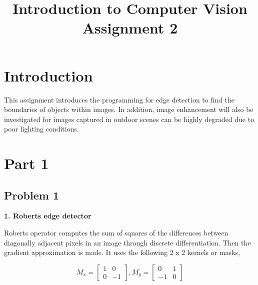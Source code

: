 \documentclass[conference]{IEEEtran}
\begin{document}
\title{Introduction to Computer Vision Assignment 2\\
}

\author{
}
\maketitle

\section{Introduction}

This assignment introduces the programming for edge detection to find the boundaries of objects within images. In addition, image enhancement will also be investigated for images captured in outdoor scenes can be highly degraded due to poor lighting conditions.

\section{Part 1}

\subsection{Problem 1}

\textbf{1. Roberts edge detector}
\newline

Roberts operator computes the sum of squares of the differences between diagonally adjacent pixels in an image through discrete differentiation. Then the gradient approximation is made. It uses the following 2 x 2 kernels or masks,

\[ M_x = 
\begin{bmatrix}
1 & 0\\
0 & -1
\end{bmatrix}, 
M_y = 
\begin{bmatrix}
0 & 1\\
-1 & 0
\end{bmatrix}
\]
\end{document}
